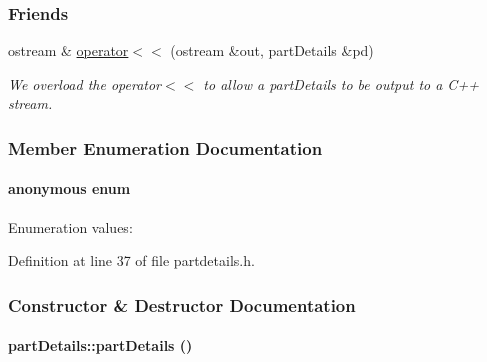 \subsubsection*{Friends}
\begin{CompactItemize}
\item 
ostream \& \hyperlink{classpartDetails_partDetailsl0}{operator$<$$<$} (ostream \&out, part\-Details \&pd)
\begin{CompactList}\small\item\em We overload the operator$<$$<$ to allow a part\-Details to be output to a C++ stream.\item\end{CompactList}\end{CompactItemize}


\subsubsection{Member Enumeration Documentation}
\hypertarget{classpartDetails_partDetailss1}{
\paragraph["@7]{\setlength{\rightskip}{0pt plus 5cm}anonymous enum}\hfill}
\label{classpartDetails_partDetailss1}


\begin{Desc}
\item[Enumeration values: ]\par
\begin{description}
\item[{\em 
\hypertarget{classpartDetails_partDetailss1partDetailss0}{
{\em MSISDNSIZE}}
\label{classpartDetails_partDetailss1partDetailss0}
}]\end{description}
\end{Desc}



Definition at line 37 of file partdetails.h.

\subsubsection{Constructor \& Destructor Documentation}
\hypertarget{classpartDetails_partDetailsa0}{
\paragraph[partDetails]{\setlength{\rightskip}{0pt plus 5cm}part\-Details::part\-Details ()}\hfill}
\label{classpartDetails_partDetailsa0}


